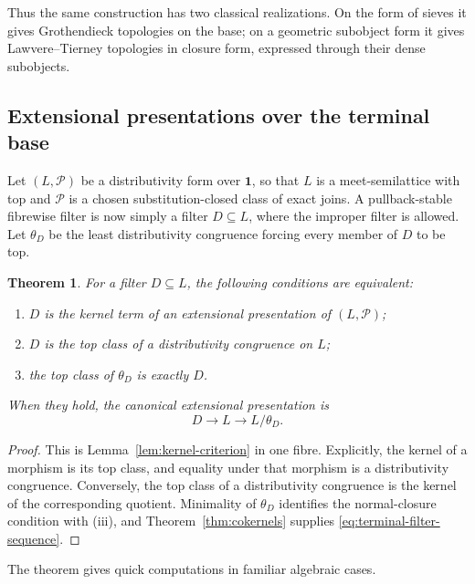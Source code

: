 \documentclass[12pt,oneside,reqno]{amsart}
\newtheorem{theorem}{Theorem}[section]
\theoremstyle{definition}
\theoremstyle{remark}
\begin{document}
Thus the same construction has two classical realizations.  On the form
of sieves it gives Grothendieck topologies on the base; on a geometric
subobject form it gives Lawvere--Tierney topologies in closure form,
expressed through their dense subobjects.

\subsection{Extensional presentations over the terminal base}

Let \((L,\mathcal P)\) be a distributivity form over \(\mathbf1\), so
that \(L\) is a meet-semilattice with top and \(\mathcal P\) is a
chosen substitution-closed class of exact joins.  A pullback-stable
fibrewise filter is now simply a filter \(D\subseteq L\), where the
improper filter is allowed.  Let \(\theta_D\) be the least
distributivity congruence forcing every member of \(D\) to be top.

\begin{theorem}\label{thm:terminal-filter-topologies}
For a filter \(D\subseteq L\), the following conditions are equivalent:
\begin{enumerate}[label=\textup{(\roman*)}]
\item \(D\) is the kernel term of an extensional presentation of
\((L,\mathcal P)\);
\item \(D\) is the top class of a distributivity congruence on \(L\);
\item the top class of \(\theta_D\) is exactly \(D\).
\end{enumerate}
When they hold, the canonical extensional presentation is
\begin{equation}\label{eq:terminal-filter-sequence}
 D\longrightarrow L\longrightarrow L/\theta_D.
\end{equation}
\end{theorem}

\begin{proof}
This is Lemma~\ref{lem:kernel-criterion} in one fibre.  Explicitly, the
kernel of a morphism is its top class, and equality under that morphism
is a distributivity congruence.  Conversely, the top class of a
distributivity congruence is the kernel of the corresponding quotient.
Minimality of \(\theta_D\) identifies the normal-closure condition with
(iii), and Theorem~\ref{thm:cokernels} supplies
\eqref{eq:terminal-filter-sequence}.
\end{proof}

The theorem gives quick computations in familiar algebraic cases.
\end{document}
